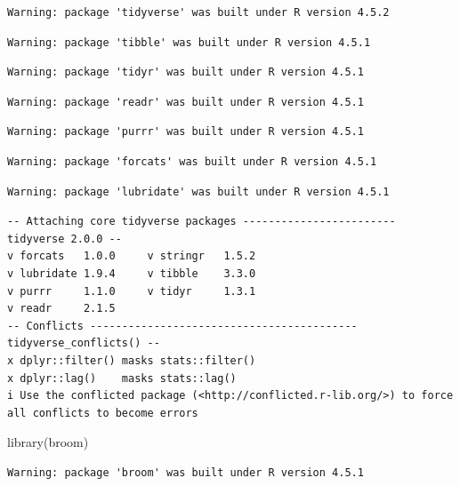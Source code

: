 \documentclass[
  letterpaper,
  DIV=11,
  numbers=noendperiod]{scrreprt}
\newenvironment{Shaded}{\begin{snugshade}}{\end{snugshade}}
\newcommand{\FunctionTok}[1]{\textcolor[rgb]{0.28,0.35,0.67}{#1}}
\newcommand{\NormalTok}[1]{\textcolor[rgb]{0.00,0.23,0.31}{#1}}
\begin{document}
\begin{verbatim}
Warning: package 'tidyverse' was built under R version 4.5.2
\end{verbatim}

\begin{verbatim}
Warning: package 'tibble' was built under R version 4.5.1
\end{verbatim}

\begin{verbatim}
Warning: package 'tidyr' was built under R version 4.5.1
\end{verbatim}

\begin{verbatim}
Warning: package 'readr' was built under R version 4.5.1
\end{verbatim}

\begin{verbatim}
Warning: package 'purrr' was built under R version 4.5.1
\end{verbatim}

\begin{verbatim}
Warning: package 'forcats' was built under R version 4.5.1
\end{verbatim}

\begin{verbatim}
Warning: package 'lubridate' was built under R version 4.5.1
\end{verbatim}

\begin{verbatim}
-- Attaching core tidyverse packages ------------------------ tidyverse 2.0.0 --
v forcats   1.0.0     v stringr   1.5.2
v lubridate 1.9.4     v tibble    3.3.0
v purrr     1.1.0     v tidyr     1.3.1
v readr     2.1.5     
-- Conflicts ------------------------------------------ tidyverse_conflicts() --
x dplyr::filter() masks stats::filter()
x dplyr::lag()    masks stats::lag()
i Use the conflicted package (<http://conflicted.r-lib.org/>) to force all conflicts to become errors
\end{verbatim}

\begin{Shaded}
\begin{Highlighting}[]
\FunctionTok{library}\NormalTok{(broom)}
\end{Highlighting}
\end{Shaded}

\begin{verbatim}
Warning: package 'broom' was built under R version 4.5.1
\end{verbatim}
\end{document}
